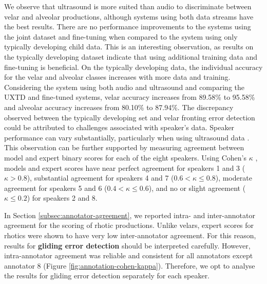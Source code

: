 We observe that ultrasound is more suited than audio to discriminate between velar and alveolar productions, although systems using both data streams have the best results.
There are no performance improvements to the systems using the joint dataset and fine-tuning when compared to the system using only typically developing child data.
This is an interesting observation, as results on the typically developing dataset indicate that using additional training data and fine-tuning is beneficial.
On the typically developing data, the individual accuracy for the velar and alveolar classes increases with more data and training.
Considering the system using both audio and ultrasound and comparing the UXTD and fine-tuned systems,
velar accuracy increases from 89.58\% to 95.58\% and alveolar accuracy increases from 80.10\% to 87.94\%.
The discrepancy observed between the typically developing set and velar fronting error detection could be attributed to challenges associated with speaker's data.
Speaker performance can vary substantially, particularly when using ultrasound data \citep{ribeiro2019speaker}.
This observation can be further supported by measuring agreement between model and expert binary scores for each of the eight speakers.
Using Cohen's $\kappa$ \citep{cohen1960coefficient}, models and expert scores have near perfect agreement for speakers 1 and 3 ($\kappa > 0.8$), substantial agreement for speakers 4 and 7 ($0.6 < \kappa \leq 0.8$), moderate agreement for speakers 5 and 6 ($0.4 < \kappa \leq 0.6$), and no or slight agreement ($\kappa \leq 0.2$) for speakers 2 and 8.

In Section \ref{subsec:annotator-agreement}, we reported intra- and inter-annotator agreement for the scoring of rhotic productions.
Unlike velars, expert scores for rhotics were shown to have very low inter-annotator agreement.
For this reason, results for \textbf{gliding error detection} should be interpreted carefully.
However, intra-annotator agreement was reliable and consistent for all annotators except annotator 8 (Figure \ref{fig:annotation-cohen-kappa}).
Therefore, we opt to analyse the results for gliding error detection separately for each speaker.

